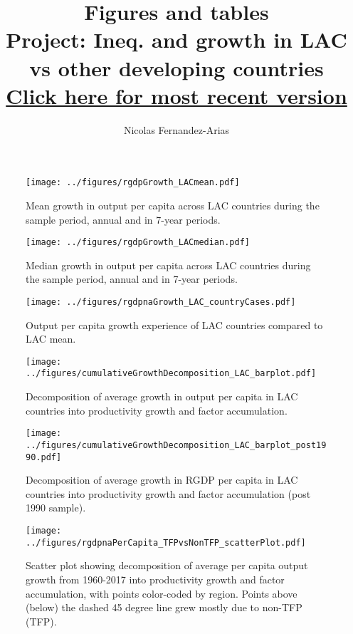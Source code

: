 \documentclass[12pt,english]{article}
\theoremstyle{remark}
\begin{document}
	
	\title{Figures and tables\\ \small Project: Ineq. and growth in LAC vs other developing countries \\ \href{https://drive.google.com/open?id=1scBTr_BbYT9DM73woQAA136QVIfP6-Jr}{Click here for most recent version}}
	\author{Nicolas Fernandez-Arias}
	\maketitle
	
	
	\begin{sidewaysfigure}[ht]
		\texttt{[image: ../figures/rgdpGrowth\_LACmean.pdf]}
		\caption{Mean growth in output per capita across LAC countries during the sample period, annual and in 7-year periods.}
	\end{sidewaysfigure}
	
	\begin{sidewaysfigure}[ht]
		\texttt{[image: ../figures/rgdpGrowth\_LACmedian.pdf]}
		\caption{Median growth in output per capita across LAC countries during the sample period, annual and in 7-year periods.}
	\end{sidewaysfigure}
	
	\begin{sidewaysfigure}[ht]
		\texttt{[image: ../figures/rgdpnaGrowth\_LAC\_countryCases.pdf]}
		\caption{Output per capita growth experience of LAC countries compared to LAC mean.}
	\end{sidewaysfigure}
	
	\begin{sidewaysfigure}[ht]
		\texttt{[image: ../figures/cumulativeGrowthDecomposition\_LAC\_barplot.pdf]}
		\caption{Decomposition of average growth in output per capita in LAC countries into productivity growth and factor accumulation.}
	\end{sidewaysfigure}
	
	\begin{sidewaysfigure}[ht]
		\texttt{[image: ../figures/cumulativeGrowthDecomposition\_LAC\_barplot\_post1990.pdf]}
		\caption{Decomposition of average growth in RGDP per capita in LAC countries into productivity growth and factor accumulation (post 1990 sample).}
	\end{sidewaysfigure}
	
	\begin{sidewaysfigure}[ht]
		\texttt{[image: ../figures/rgdpnaPerCapita\_TFPvsNonTFP\_scatterPlot.pdf]}
		\caption{Scatter plot showing decomposition of average per capita output growth from 1960-2017 into productivity growth and factor accumulation, with points color-coded by region. Points above (below) the dashed 45 degree line grew mostly due to non-TFP (TFP).}
	\end{sidewaysfigure}
	
\end{document}
